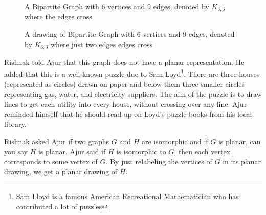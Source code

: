 \begin{figure}
\begin{center}
\caption{ A Bipartite Graph with 6 vertices and 9 edges, denoted by $K_{3,3}$ where the edges cross}\label{9g5}
\end{center}
\end{figure}
\begin{figure}
\begin{center}
\caption{ A  drawing of Bipartite Graph with 6 vertices and 9 edges, denoted by $K_{3,3}$ where just two edges edges cross}\label{9g6}
\end{center}
\end{figure}
Rishnak told Ajur that this graph does not have a planar representation. He added that this is a well known puzzle due to Sam Loyd\footnote{Sam Lloyd is a famous American Recreational Mathematician who has contributed a lot of puzzles}. There are three houses (represented as circles) drawn on paper and below them three smaller circles representing gas, water, and electricity suppliers. The aim of the puzzle is to draw lines to get each utility into every house, without crossing over any line. Ajur reminded himself that he should read up on Loyd's puzzle books from his local library.

 Rishnak asked Ajur if two graphs $G$ and $H$ are isomorphic and if $G$ is planar, can you say $H$ is planar. Ajur said if $H$ is isomorphic to $G$, then each vertex corresponds to some vertex of $G$. By just relabeling the vertices of $G$ in its planar drawing, we get a planar drawing of $H$.

